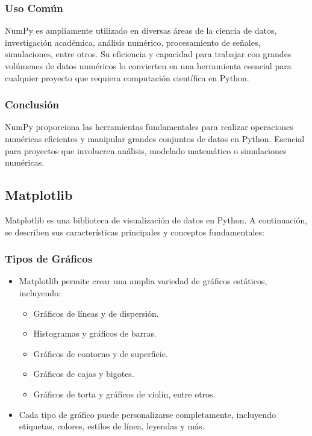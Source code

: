 \documentclass[conference]{IEEEtran}
\begin{document}
    \subsubsection*{Uso Común}
    
    NumPy es ampliamente utilizado en diversas áreas de la ciencia de datos, investigación académica, análisis numérico, procesamiento de señales, simulaciones, entre otros. Su eficiencia y capacidad para trabajar con grandes volúmenes de datos numéricos lo convierten en una herramienta esencial para cualquier proyecto que requiera computación científica en Python.
    
    \subsubsection*{Conclusión}
    NumPy proporciona las herramientas fundamentales para realizar operaciones numéricas eficientes y manipular grandes conjuntos de datos en Python. Esencial para proyectos que involucren análisis, modelado matemático o simulaciones numéricas.
    
    \subsection{Matplotlib}
    Matplotlib es una biblioteca de visualización de datos en Python. A continuación, se describen sus características principales y conceptos fundamentales:
    
    \subsubsection*{Tipos de Gráficos}
    \begin{itemize}
      \item Matplotlib permite crear una amplia variedad de gráficos estáticos, incluyendo:
        \begin{itemize}
          \item Gráficos de líneas y de dispersión.
          \item Histogramas y gráficos de barras.
          \item Gráficos de contorno y de superficie.
          \item Gráficos de cajas y bigotes.
          \item Gráficos de torta y gráficos de violín, entre otros.
        \end{itemize}
      
      \item Cada tipo de gráfico puede personalizarse completamente, incluyendo etiquetas, colores, estilos de línea, leyendas y más.
    \end{itemize}
    
\end{document}
